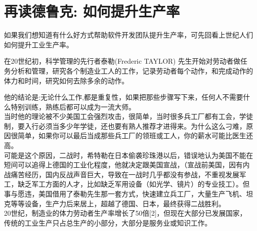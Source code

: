 \chapter[如何提升生产率]{再读德鲁克: 如何提升生产率} %


如果我们想知道有什么好方式帮助软件开发团队提升生产率，可先回看上世纪人们如何提升工业生产率。

在20世纪初，科学管理的先行者泰勒(Frederic TAYLOR)
先生开始对劳动者做任务分析和管理，研究各个制造业工人的工作，记录劳动者每个动作，和完成动作的体力和时间，研究如何去除多余的动作。

他的结论是:无论什么工作,都是重复性，如果把那些步骤写下来，任何人不需要什么特别训练，熟练后都可以成为一流大师。\\
当时他的理论被不少美国工会强烈攻击，很简单，当时很多兵工厂都有工会，学徒制，要入行必须当多少年学徒，还也要有熟人推荐才进得来。为什么这么刁难，原因很简单，如果你可以最后当成那些兵工厂的领班或工人，你的薪水可能比医生还高。\\
可能是这个原因，二战时，希特勒在日本偷袭珍珠港以后，错误地认为美国不能在短间可以追得上德国的工业化程度，他就决定跟美国宣战，（宣战前美国，因有内战痛苦经历，国内反战声音巨大，导致在一战时几乎都没有参战，不重视发展军工，缺乏军工方面的人才，比如缺乏军用设备（如光学、镜片）的专业技工）。但事与愿违，美国借用了泰勒先生那一套方式，快速建立兵工厂，大量生产飞机、坦克等等设备，生产力后来居上，超越了德国、日本，最终获得二战胜利。\\
20世纪，制造业的体力劳动者生产率增长了50倍{[}2{]}，但现在大部分已发展国家，传统的工业生产只占总生产的小部分，大部分是服务业或知识工作。

